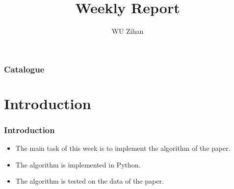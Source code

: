 \documentclass{beamer}
\title{Weekly Report}
\author{WU Zihan}
\begin{document}
\maketitle
\begin{frame}
    \frametitle{Catalogue}
    \tableofcontents
\end{frame}

\section{Introduction}
\begin{frame}
    \frametitle{Introduction}
    \begin{itemize}
        \item The main task of this week is to implement the algorithm of the paper.
        \item The algorithm is implemented in Python.
        \item The algorithm is tested on the data of the paper.
    \end{itemize}
\end{frame}
\end{document}
